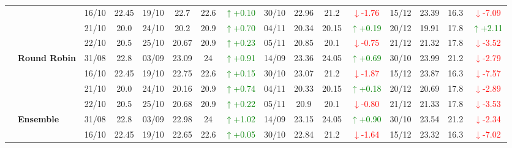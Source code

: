 {\begin{longtable}{llcc|cccc|cccc|cccc}
& 
& 16/10 & 22.45 & 19/10 & 22.7 & 22.6 & \textcolor{green}{\(\uparrow\)+0.10} & 30/10 & 22.96 & 21.2 & \textcolor{red}{\(\downarrow\)-1.76} & 15/12 & 23.39 & 16.3 & \textcolor{red}{\(\downarrow\)-7.09} \\

& 
& 21/10 & 20.0 & 24/10 & 20.2 & 20.9 & \textcolor{green}{\(\uparrow\)+0.70} & 04/11 & 20.34 & 20.15 & \textcolor{green}{\(\uparrow\)+0.19} & 20/12 & 19.91 & 17.8 & \textcolor{green}{\(\uparrow\)+2.11} \\

&
& 22/10 & 20.5 & 25/10 & 20.67 & 20.9 & \textcolor{green}{\(\uparrow\)+0.23} & 05/11 & 20.85 & 20.1 & \textcolor{red}{\(\downarrow\)-0.75} & 21/12 & 21.32 & 17.8 & \textcolor{red}{\(\downarrow\)-3.52} \\
\cmidrule(lr){2-16}


& \textbf{Round Robin}
& 31/08 & 22.8 & 03/09 & 23.09 & 24 & \textcolor{green}{\(\uparrow\)+0.91} & 14/09 & 23.36 & 24.05 & \textcolor{green}{\(\uparrow\)+0.69} & 30/10 & 23.99 & 21.2 & \textcolor{red}{\(\downarrow\)-2.79} \\

&
& 16/10 & 22.45 & 19/10 & 22.75 & 22.6 & \textcolor{green}{\(\uparrow\)+0.15} & 30/10 & 23.07 & 21.2 & \textcolor{red}{\(\downarrow\)-1.87} & 15/12 & 23.87 & 16.3 & \textcolor{red}{\(\downarrow\)-7.57} \\

&
& 21/10 & 20.0 & 24/10 & 20.16 & 20.9 & \textcolor{green}{\(\uparrow\)+0.74} & 04/11 & 20.33 & 20.15 & \textcolor{green}{\(\uparrow\)+0.18} & 20/12 & 20.69 & 17.8 & \textcolor{red}{\(\downarrow\)-2.89} \\

&
& 22/10 & 20.5 & 25/10 & 20.68 & 20.9 & \textcolor{green}{\(\uparrow\)+0.22} & 05/11 & 20.9 & 20.1 & \textcolor{red}{\(\downarrow\)-0.80} & 21/12 & 21.33 & 17.8 & \textcolor{red}{\(\downarrow\)-3.53} \\
\cmidrule(lr){2-16}


& \textbf{Ensemble}
& 31/08 & 22.8 & 03/09 & 22.98 & 24 & \textcolor{green}{\(\uparrow\)+1.02} & 14/09 & 23.15 & 24.05 & \textcolor{green}{\(\uparrow\)+0.90} & 30/10 & 23.54 & 21.2 & \textcolor{red}{\(\downarrow\)-2.34} \\

&
& 16/10 & 22.45 & 19/10 & 22.65 & 22.6 & \textcolor{green}{\(\uparrow\)+0.05} & 30/10 & 22.84 & 21.2 & \textcolor{red}{\(\downarrow\)-1.64} & 15/12 & 23.32 & 16.3 & \textcolor{red}{\(\downarrow\)-7.02} \\


\end{longtable}}
